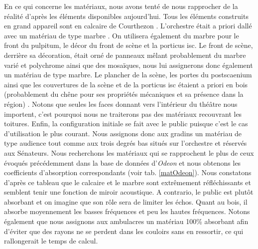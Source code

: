 En ce qui concerne les matériaux, nous avons tenté de nous rapprocher de la réalité d'après les éléments disponibles aujourd'hui. Tous les éléments construits en grand appareil sont en calcaire de Courthezon \cite[p.43]{orangeTxt}. L'orchestre était a priori dallé avec un matériau de type marbre \cite[p.337]{orangeTxt}. On utilisera également du marbre pour le front du \gls{pulpitum}, le décor du front de scène et la \gls{porticus isc}. Le front de scène, derrière sa décoration, était orné de panneaux mêlant probablement du marbre varié et polychrome ainsi que des mosaïques, nous lui assignerons donc également un matériau de type marbre. Le plancher de la scène, les portes du \gls{postscaenium} ainsi que les couvertures de la scène et de la \gls{porticus isc} étaient a priori en bois (probablement du chêne pour ses propriétés mécaniques et sa présence dans la région) \cite[p.34 et 43]{formige}. Notons que seules les faces donnant vers l'intérieur du théâtre nous importent, c'est pourquoi nous ne traiterons pas des matériaux recouvrant les toitures. Enfin, la configuration initiale se fait avec le public puisque c'est le cas d'utilisation le plus courant. Nous assignons donc aux gradins un matériau de type audience tout comme aux trois degrés bas situés sur l'orchestre et réservés aux Sénateurs.  Nous recherchons les matériaux qui se rapprochent le plus de ceux évoqués précédemment dans la base de données d'\textit{Odeon}\cite[materials]{odeon} et nous obtenons les coefficients d'absorption correspondants (voir tab. \ref{matOdeon}). Nous constatons d'après ce tableau que le calcaire et le marbre sont extrêmement réfléchissants et semblent tenir une fonction de miroir acoustique. A contrario, le public est plutôt absorbant et on imagine que son rôle sera de limiter les échos. Quant au bois, il absorbe moyennement les basses fréquences et peu les hautes fréquences. Notons également que nous assignons aux ambulacres un matériau 100\% absorbant afin d'éviter que des rayons ne se perdent dans les couloirs sans en ressortir, ce qui rallongerait le temps de calcul.
%

